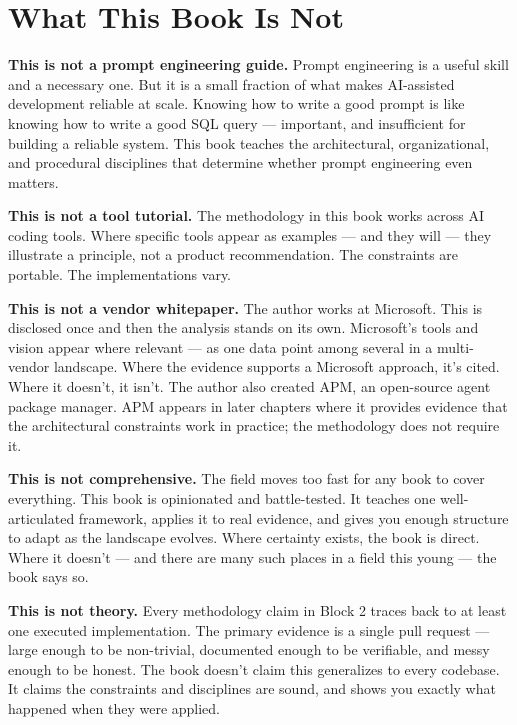 \documentclass[
  a4paper,
  DIV=11,
  numbers=noendperiod]{scrreprt}
\begin{document}
\section{What This Book Is Not}\label{what-this-book-is-not}

\textbf{This is not a prompt engineering guide.} Prompt engineering is a
useful skill and a necessary one. But it is a small fraction of what
makes AI-assisted development reliable at scale. Knowing how to write a
good prompt is like knowing how to write a good SQL query --- important,
and insufficient for building a reliable system. This book teaches the
architectural, organizational, and procedural disciplines that determine
whether prompt engineering even matters.

\textbf{This is not a tool tutorial.} The methodology in this book works
across AI coding tools. Where specific tools appear as examples --- and
they will --- they illustrate a principle, not a product recommendation.
The constraints are portable. The implementations vary.

\textbf{This is not a vendor whitepaper.} The author works at Microsoft.
This is disclosed once and then the analysis stands on its own.
Microsoft's tools and vision appear where relevant --- as one data point
among several in a multi-vendor landscape. Where the evidence supports a
Microsoft approach, it's cited. Where it doesn't, it isn't. The author
also created APM, an open-source agent package manager. APM appears in
later chapters where it provides evidence that the architectural
constraints work in practice; the methodology does not require it.

\textbf{This is not comprehensive.} The field moves too fast for any
book to cover everything. This book is opinionated and battle-tested. It
teaches one well-articulated framework, applies it to real evidence, and
gives you enough structure to adapt as the landscape evolves. Where
certainty exists, the book is direct. Where it doesn't --- and there are
many such places in a field this young --- the book says so.

\textbf{This is not theory.} Every methodology claim in Block 2 traces
back to at least one executed implementation. The primary evidence is a
single pull request --- large enough to be non-trivial, documented
enough to be verifiable, and messy enough to be honest. The book doesn't
claim this generalizes to every codebase. It claims the constraints and
disciplines are sound, and shows you exactly what happened when they
were applied.
\end{document}
